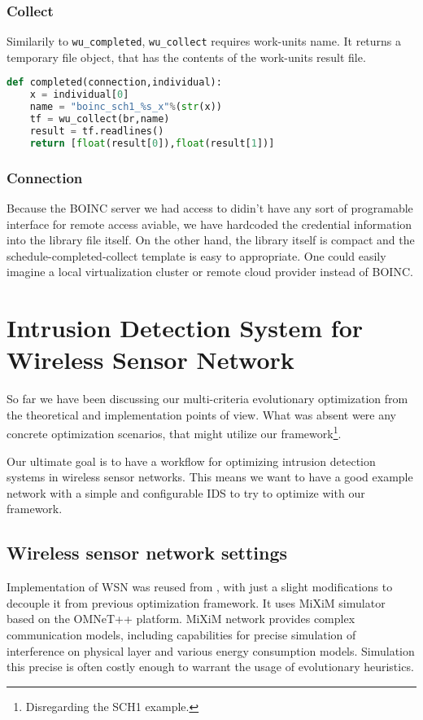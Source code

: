 \documentclass[12pt,oneside]{fithesis2}
\begin{document}
\subsection{Collect}
Similarily to \lstinline$wu_completed$, \lstinline$wu_collect$ requires work-units name. It returns a temporary file object, that has the contents of the work-units result file. 

\begin{lstlisting}[language=Python,label=boinc_pop,caption=Boinc Evaluation]
def completed(connection,individual):
    x = individual[0]
    name = "boinc_sch1_%s_x"%(str(x))
    tf = wu_collect(br,name)
    result = tf.readlines()
    return [float(result[0]),float(result[1])]
\end{lstlisting} 

\subsection{Connection}
Because the BOINC server we had access to didin't have any sort of programable interface for remote access aviable, we have hardcoded the credential information into the library file itself. On the other hand, the library itself is compact and the schedule-completed-collect template is easy to appropriate. One could easily imagine a local virtualization cluster or remote cloud provider instead of BOINC.

\chapter{Intrusion Detection System for Wireless Sensor Network}
\label{chap:WSN}
So far we have been discussing our multi-criteria evolutionary optimization from the theoretical and implementation points of view. What was absent were any concrete optimization scenarios, that might utilize our framework\footnote{Disregarding the SCH1 example.}. 

Our ultimate goal is to have a workflow for optimizing intrusion detection systems in wireless sensor networks. This means we want to have a good example network with a simple and configurable IDS to try to optimize with our framework. 

\section{Wireless sensor network settings}
Implementation of WSN was reused from \cite{Stetsko12}, with just a slight modifications to decouple it from previous optimization framework. It uses MiXiM simulator based on the OMNeT++ platform. MiXiM network provides complex communication models, including capabilities for precise simulation of interference on physical layer and various energy consumption models. Simulation this precise is often costly enough to warrant the usage of evolutionary heuristics.
\end{document}
